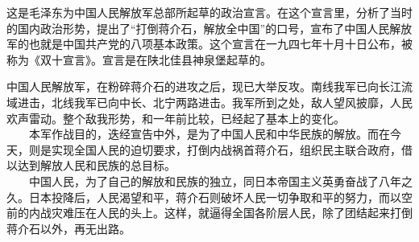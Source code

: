 \documentclass[cn,11pt,chinese]{elegantbook}
\begin{document}
\begin{introduction}\item  这是毛泽东为中国人民解放军总部所起草的政治宣言。在这个宣言里，分析了当时的国内政治形势，提出了“打倒蒋介石，解放全中国”的口号，宣布了中国人民解放军的也就是中国共产党的八项基本政策。这个宣言在一九四七年十月十日公布，被称为《双十宣言》。宣言是在陕北佳县神泉堡起草的。\end{introduction}
中国人民解放军，在粉碎蒋介石的进攻之后，现已大举反攻。南线我军已向长江流域进击，北线我军已向中长、北宁两路进击。我军所到之处，敌人望风披靡，人民欢声雷动。整个敌我形势，和一年前比较，已经起了基本上的变化。\\
　　本军作战目的，迭经宣告中外，是为了中国人民和中华民族的解放。而在今天，则是实现全国人民的迫切要求，打倒内战祸首蒋介石，组织民主联合政府，借以达到解放人民和民族的总目标。\\
　　中国人民，为了自己的解放和民族的独立，同日本帝国主义英勇奋战了八年之久。日本投降后，人民渴望和平，蒋介石则破坏人民一切争取和平的努力，而以空前的内战灾难压在人民的头上。这样，就逼得全国各阶层人民，除了团结起来打倒蒋介石以外，再无出路。\\
\end{document}
